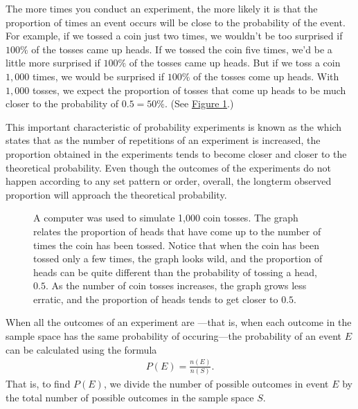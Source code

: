 \documentclass[letterpaper,10pt,english]{jupyterBook}
\begin{document}
\sphinxAtStartPar
The more times you conduct an experiment, the more likely it is that the proportion of times an event occurs will be close to the probability of the event. For example, if we tossed a coin just two times, we wouldn’t be too surprised if \(100\%\) of the tosses came up heads. If we tossed the coin five times, we’d be a little more surprised if \(100\%\) of the tosses came up heads. But if we toss a coin \(1,000\) times, we would be  surprised if \(100\%\) of the tosses come up heads. With \(1,000\) tosses, we expect the proportion of tosses that come up heads to be much closer to the probability of \(0.5 = 50\%\). (See \hyperref[\detokenize{Ch3 Probability/3.1 Introduction to Probability:observed-coin-flips}]{Figure \ref{\detokenize{Ch3 Probability/3.1 Introduction to Probability:observed-coin-flips}}}.)

\sphinxAtStartPar
This important characteristic of probability experiments is known as the  which states that as the number of repetitions of an experiment is increased, the proportion obtained in the experiments tends to become closer and closer to the theoretical probability. Even though the outcomes of the experiments do not happen according to any set pattern or order, overall, the long\sphinxhyphen{}term observed proportion will approach the theoretical probability.

\begin{figure}[htbp]
\centering
\capstart

\noindent{}
\caption{A computer was used to simulate 1,000 coin tosses. The graph relates the proportion of heads that have come up to the number of times the coin has been tossed. Notice that when the coin has been tossed only a few times, the graph looks wild, and the proportion of heads can be quite different than the probability of tossing a head, \(0.5\). As the number of coin tosses increases, the graph grows less erratic, and the proportion of heads tends to get closer to \(0.5\).}\label{\detokenize{Ch3 Probability/3.1 Introduction to Probability:observed-coin-flips}}\end{figure}

\sphinxAtStartPar
When all the outcomes of an experiment are —that is, when each outcome in the sample space has the same probability of occuring—the probability of an event \(E\) can be calculated using the formula
\begin{equation*}
\begin{split} P(E) = \frac{n(E)}{n(S)}. \end{split}
\end{equation*}
\sphinxAtStartPar
That is, to find \(P(E)\), we divide the number of possible outcomes in event \(E\) by the total number of possible outcomes in the sample space \(S\).
\end{document}
